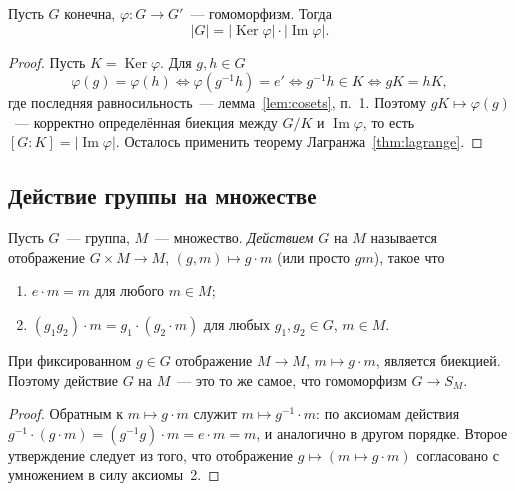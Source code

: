 \documentclass[12pt]{article}
\begin{document}
	\begin{theorem}\label{thm:hom-order}
		Пусть $G$ конечна, $\varphi: G \to G'$~--- гомоморфизм. Тогда
		\[
			|G| = |\operatorname{Ker}\varphi| \cdot |\operatorname{Im}\varphi|.
		\]
	\end{theorem}

	\begin{proof}
		Пусть $K = \operatorname{Ker}\varphi$. Для $g, h \in G$
		\[
			\varphi(g) = \varphi(h) \iff \varphi(g^{-1}h) = e' \iff g^{-1}h \in K \iff gK = hK,
		\]
		где последняя равносильность~--- лемма~\ref{lem:cosets}, п.~1. Поэтому $gK \mapsto \varphi(g)$~--- корректно определённая биекция между $G/K$ и $\operatorname{Im}\varphi$, то есть $[G : K] = |\operatorname{Im}\varphi|$. Осталось применить теорему Лагранжа~\ref{thm:lagrange}.
	\end{proof}

	\subsection{Действие группы на множестве}

	\begin{definition}[Действие]\label{def:action}
		Пусть $G$~--- группа, $M$~--- множество. \emph{Действием} $G$ на $M$ называется отображение $G \times M \to M$, $(g, m) \mapsto g \cdot m$ (или просто $gm$), такое что
		\begin{enumerate}
			\item $e \cdot m = m$ для любого $m \in M$;
			\item $(g_1g_2) \cdot m = g_1 \cdot (g_2 \cdot m)$ для любых $g_1, g_2 \in G$, $m \in M$.
		\end{enumerate}
	\end{definition}

	\begin{statement}\label{st:action-bijection}
		При фиксированном $g \in G$ отображение $M \to M$, $m \mapsto g \cdot m$, является биекцией. Поэтому действие $G$ на $M$~--- это то же самое, что гомоморфизм $G \to S_M$.
	\end{statement}

	\begin{proof}
		Обратным к $m \mapsto g \cdot m$ служит $m \mapsto g^{-1} \cdot m$: по аксиомам действия $g^{-1} \cdot (g \cdot m) = (g^{-1}g) \cdot m = e \cdot m = m$, и аналогично в другом порядке. Второе утверждение следует из того, что отображение $g \mapsto (m \mapsto g \cdot m)$ согласовано с умножением в силу аксиомы~2.
	\end{proof}
\end{document}
